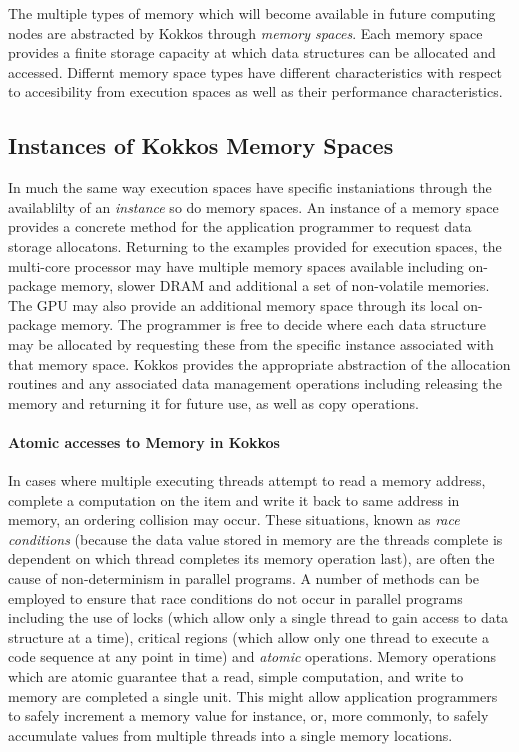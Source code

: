 The multiple types of memory which will become available in future
computing nodes are abstracted by Kokkos through {\em memory
spaces}. Each memory space provides a finite storage capacity
at which data structures can be allocated and accessed. 
Differnt memory space types have different characteristics with respect
to accesibility from execution spaces as well as their performance
characteristics. 

\subsection{Instances of Kokkos Memory Spaces}

In much the same way execution spaces have specific instaniations through
the availablilty of an {\em instance} so do memory spaces. An instance
of a memory space provides a concrete method for the
application programmer to request data storage allocatons. Returning
to the examples provided for execution spaces, the multi-core
processor may have multiple memory spaces available including
on-package memory, slower DRAM and additional a set of non-volatile
memories. The GPU may also provide an additional memory space
through its local on-package memory. The programmer is free
to decide where each data structure may be allocated by requesting
these from the specific instance associated with that memory space.
Kokkos provides the appropriate abstraction of the allocation
routines and any associated data management operations including
releasing the memory and returning it for future use, as well as
copy operations.

\paragraph{Atomic accesses to Memory in Kokkos}

In cases where multiple executing threads attempt to read
a memory address, complete a computation on the item and
write it back to same address in memory, an ordering
collision may occur. These situations, known as
{\em race conditions} (because the data value
stored in memory are the threads complete is dependent
on which thread completes its memory operation last),
are often the cause of non-determinism in parallel
programs. A number of methods can be employed to ensure
that race conditions do not occur in parallel programs
including the use of locks (which allow only a single
thread to gain access to data structure at a time),
critical regions (which allow only one thread to execute
a code sequence at any point in time) and {\em atomic}
operations. Memory operations which are atomic guarantee
that a read, simple computation, and write to memory
are completed a single unit. This might allow application
programmers to safely increment a memory value for instance,
or, more commonly, to safely accumulate values from multiple
threads into a single memory locations.



